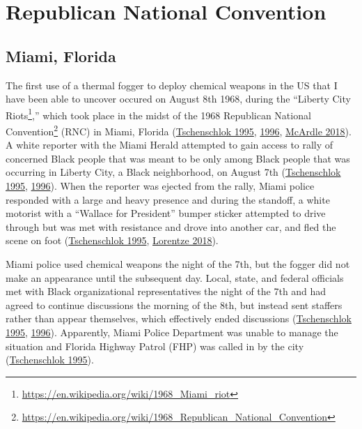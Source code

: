 \documentclass[
  11pt,
]{krantz}
\renewcommand{\href}[2]{#2\footnote{\url{#1}}}
\begin{document}
\hypertarget{republican-national-convention}{%
\section{Republican National Convention}\label{republican-national-convention}}

\hypertarget{MiamiFL1968_08_08}{%
\subsection{Miami, Florida}\label{MiamiFL1968_08_08}}

The first use of a thermal fogger to deploy chemical weapons in the US that I have been able to uncover occured on August 8th 1968, during the ``\href{https://en.wikipedia.org/wiki/1968_Miami_riot}{Liberty City Riots},'' which took place in the midst of the \href{https://en.wikipedia.org/wiki/1968_Republican_National_Convention}{1968 Republican National Convention} (RNC) in Miami, Florida (\protect\hyperlink{ref-Tschenschlok1995}{Tschenschlok 1995}, \protect\hyperlink{ref-Tschenschlok1996}{1996}, \protect\hyperlink{ref-McArdle2018}{McArdle 2018}).
A white reporter with the Miami Herald attempted to gain access to rally of concerned Black people that was meant to be only among Black people that was occurring in Liberty City, a Black neighborhood, on August 7th (\protect\hyperlink{ref-Tschenschlok1995}{Tschenschlok 1995}, \protect\hyperlink{ref-Tschenschlok1996}{1996}).
When the reporter was ejected from the rally, Miami police responded with a large and heavy presence and during the standoff, a white motorist with a ``Wallace for President'' bumper sticker attempted to drive through but was met with resistance and drove into another car, and fled the scene on foot (\protect\hyperlink{ref-Tschenschlok1995}{Tschenschlok 1995}, \protect\hyperlink{ref-Lorentzen2018}{Lorentze 2018}).

Miami police used chemical weapons the night of the 7th, but the fogger did not make an appearance until the subsequent day.
Local, state, and federal officials met with Black organizational representatives the night of the 7th and had agreed to continue discussions the morning of the 8th, but instead sent staffers rather than appear themselves, which effectively ended discussions (\protect\hyperlink{ref-Tschenschlok1995}{Tschenschlok 1995}, \protect\hyperlink{ref-Tschenschlok1996}{1996}).
Apparently, Miami Police Department was unable to manage the situation and Florida Highway Patrol (FHP) was called in by the city (\protect\hyperlink{ref-Tschenschlok1995}{Tschenschlok 1995}).
\end{document}
